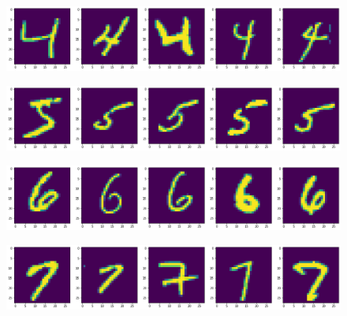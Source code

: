 \documentclass[
  letterpaper,
  DIV=11,
  numbers=noendperiod]{scrreprt}
\begin{document}
\begin{figure}[H]

{\centering \includegraphics{notebooks/W10. Machine Learning_files/figure-pdf/cell-5-output-5.png}

}

\end{figure}

\begin{figure}[H]

{\centering \includegraphics{notebooks/W10. Machine Learning_files/figure-pdf/cell-5-output-6.png}

}

\end{figure}

\begin{figure}[H]

{\centering \includegraphics{notebooks/W10. Machine Learning_files/figure-pdf/cell-5-output-7.png}

}

\end{figure}

\begin{figure}[H]

{\centering \includegraphics{notebooks/W10. Machine Learning_files/figure-pdf/cell-5-output-8.png}

}

\end{figure}
\end{document}
